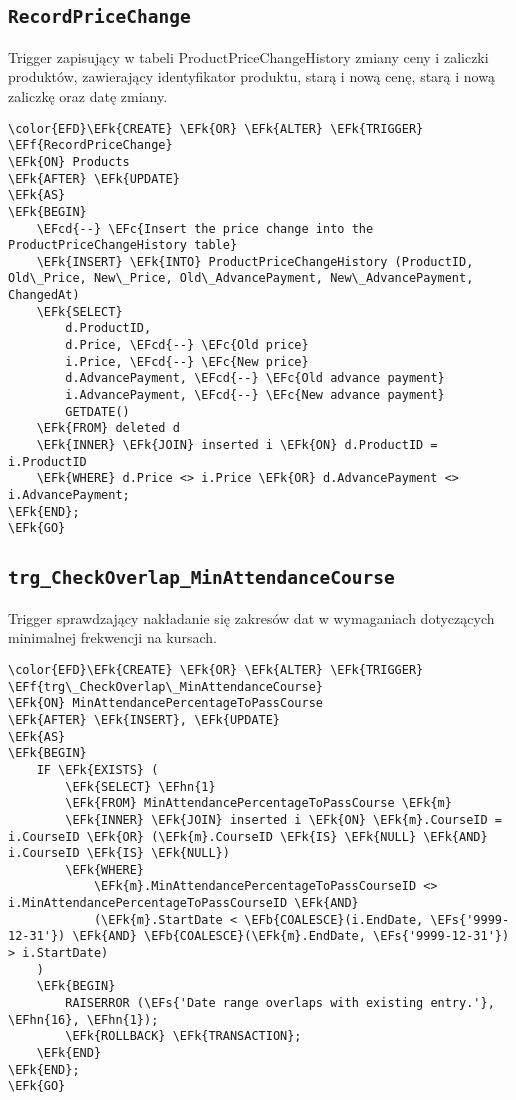 \documentclass[11pt]{article}
\newcommand{\EFc}[1]{\textcolor{EFc}{\textit{#1}}} %
\newcommand{\EFcd}[1]{\textcolor{EFcd}{\textit{#1}}} %
\newcommand{\EFs}[1]{\textcolor{EFs}{#1}} %
\newcommand{\EFk}[1]{\textcolor{EFk}{\textbf{#1}}} %
\newcommand{\EFb}[1]{\textcolor{EFb}{\textbf{#1}}} %
\newcommand{\EFf}[1]{\textcolor{EFf}{#1}} %
\newcommand{\EFhn}[1]{\textcolor{EFhn}{#1}} %
\begin{document}
\subsection{\texttt{RecordPriceChange}}
\label{sec:orgf62f454}
Trigger zapisujący w tabeli ProductPriceChangeHistory zmiany ceny i zaliczki produktów, zawierający identyfikator produktu, starą i nową cenę, starą i nową zaliczkę oraz datę zmiany.
\begin{Code}
\begin{Verbatim}
\color{EFD}\EFk{CREATE} \EFk{OR} \EFk{ALTER} \EFk{TRIGGER} \EFf{RecordPriceChange}
\EFk{ON} Products
\EFk{AFTER} \EFk{UPDATE}
\EFk{AS}
\EFk{BEGIN}
    \EFcd{--} \EFc{Insert the price change into the ProductPriceChangeHistory table}
    \EFk{INSERT} \EFk{INTO} ProductPriceChangeHistory (ProductID, Old\_Price, New\_Price, Old\_AdvancePayment, New\_AdvancePayment, ChangedAt)
    \EFk{SELECT} 
        d.ProductID,
        d.Price, \EFcd{--} \EFc{Old price}
        i.Price, \EFcd{--} \EFc{New price}
        d.AdvancePayment, \EFcd{--} \EFc{Old advance payment}
        i.AdvancePayment, \EFcd{--} \EFc{New advance payment}
        GETDATE()
    \EFk{FROM} deleted d
    \EFk{INNER} \EFk{JOIN} inserted i \EFk{ON} d.ProductID = i.ProductID
    \EFk{WHERE} d.Price <> i.Price \EFk{OR} d.AdvancePayment <> i.AdvancePayment;
\EFk{END};
\EFk{GO}
\end{Verbatim}
\end{Code}
\subsection{\texttt{trg\_CheckOverlap\_MinAttendanceCourse}}
\label{sec:org78c6764}
Trigger sprawdzający nakładanie się zakresów dat w wymaganiach dotyczących minimalnej frekwencji na kursach.
\begin{Code}
\begin{Verbatim}
\color{EFD}\EFk{CREATE} \EFk{OR} \EFk{ALTER} \EFk{TRIGGER} \EFf{trg\_CheckOverlap\_MinAttendanceCourse}
\EFk{ON} MinAttendancePercentageToPassCourse
\EFk{AFTER} \EFk{INSERT}, \EFk{UPDATE}
\EFk{AS}
\EFk{BEGIN}
    IF \EFk{EXISTS} (
        \EFk{SELECT} \EFhn{1} 
        \EFk{FROM} MinAttendancePercentageToPassCourse \EFk{m}
        \EFk{INNER} \EFk{JOIN} inserted i \EFk{ON} \EFk{m}.CourseID = i.CourseID \EFk{OR} (\EFk{m}.CourseID \EFk{IS} \EFk{NULL} \EFk{AND} i.CourseID \EFk{IS} \EFk{NULL})
        \EFk{WHERE} 
            \EFk{m}.MinAttendancePercentageToPassCourseID <> i.MinAttendancePercentageToPassCourseID \EFk{AND}
            (\EFk{m}.StartDate < \EFb{COALESCE}(i.EndDate, \EFs{'9999-12-31'}) \EFk{AND} \EFb{COALESCE}(\EFk{m}.EndDate, \EFs{'9999-12-31'}) > i.StartDate)
    )
    \EFk{BEGIN}
        RAISERROR (\EFs{'Date range overlaps with existing entry.'}, \EFhn{16}, \EFhn{1});
        \EFk{ROLLBACK} \EFk{TRANSACTION};
    \EFk{END}
\EFk{END};
\EFk{GO}
\end{Verbatim}
\end{Code}
\end{document}
